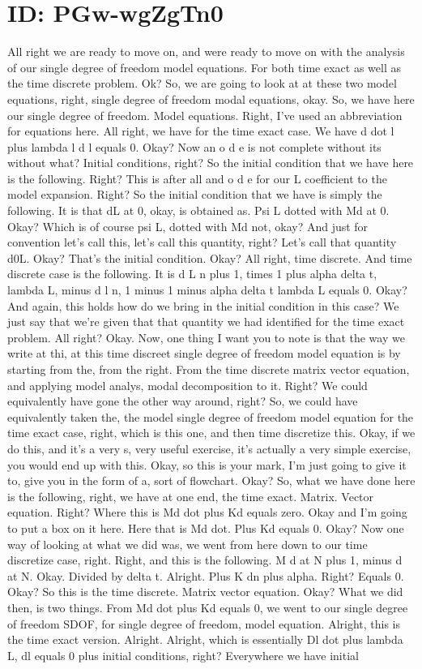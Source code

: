\documentclass[10pt]{article}
\begin{document}
\section*{ID: PGw-wgZgTn0}
All right we are ready to move on, and were ready to move on with the analysis of our single degree of freedom model equations. For both time exact as well as the time discrete problem. Ok? So, we are going to look at at these two model equations, right, single degree of freedom modal equations, okay. So, we have here our single degree of freedom. Model equations. Right, I've used an abbreviation for equations here. All right, we have for the time exact case. We have d dot l plus lambda l d l equals 0. Okay? Now an o d e is not complete without its without what? Initial conditions, right? So the initial condition that we have here is the following. Right? This is after all and o d e for our L coefficient to the model expansion. Right? So the initial condition that we have is simply the following. It is that dL at 0, okay, is obtained as. Psi L dotted with Md at 0. Okay? Which is of course psi L, dotted with Md not, okay? And just for convention let's call this, let's call this quantity, right? Let's call that quantity d0L. Okay? That's the initial condition. Okay? All right, time discrete. And time discrete case is the following. It is d L n plus 1, times 1 plus alpha delta t, lambda L, minus d l n, 1 minus 1 minus alpha delta t lambda L equals 0. Okay? And again, this holds how do we bring in the initial condition in this case? We just say that we're given that that quantity we had identified for the time exact problem. All right? Okay. Now, one thing I want you to note is that the way we write at thi, at this time discreet single degree of freedom model equation is by starting from the, from the right. From the time discrete matrix vector equation, and applying model analys, modal decomposition to it. Right? We could equivalently have gone the other way around, right? So, we could have equivalently taken the, the model single degree of freedom model equation for the time exact case, right, which is this one, and then time discretize this. Okay, if we do this, and it's a very s, very useful exercise, it's actually a very simple exercise, you would end up with this. Okay, so this is your mark, I'm just going to give it to, give you in the form of a, sort of flowchart. Okay? So, what we have done here is the following, right, we have at one end, the time exact. Matrix. Vector equation. Right? Where this is Md dot plus Kd equals zero. Okay and I'm going to put a box on it here. Here that is Md dot. Plus Kd equals 0. Okay? Now one way of looking at what we did was, we went from here down to our time discretize case, right. Right, and this is the following. M d at N plus 1, minus d at N. Okay. Divided by delta t. Alright. Plus K dn plus alpha. Right? Equals 0. Okay? So this is the time discrete. Matrix vector equation. Okay? What we did then, is two things. From Md dot plus Kd equals 0, we went to our single degree of freedom SDOF, for single degree of freedom, model equation. Alright, this is the time exact version. Alright. Alright, which is essentially Dl dot plus lambda L, dl equals 0 plus initial conditions, right? Everywhere we have initial 
\end{document}
